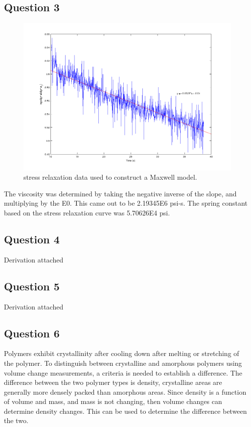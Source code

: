 \documentclass[12pt]{report}
\begin{document}
\subsection{Question 3}
\begin{figure}[H]
	\includegraphics[width=1\textwidth]{problem3.png}
	\caption{stress relaxation data used to construct a Maxwell model.}
	\label{fig:Figure2}
\end{figure}

The viscosity was determined by taking the negative inverse of the slope, and multiplying by the E0. This came out to be 2.19345E6 psi-s. The spring constant based on the stress relaxation curve was 5.70626E4 psi.

\subsection{Question 4}
Derivation attached

\subsection{Question 5}
Derivation attached

\subsection{Question 6}
Polymers exhibit crystallinity after cooling down after melting or stretching of the polymer. To distinguish between crystalline and amorphous polymers using volume change measurements, a criteria is needed to establish a difference. The difference between the two polymer types is density, crystalline areas are generally more densely packed than amorphous areas. Since density is a function of volume and mass, and mass is not changing, then volume changes can determine density changes. This can be used to determine the difference between the two.
\end{document}
